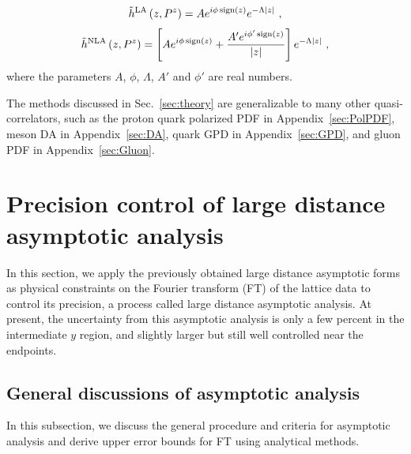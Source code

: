\documentclass[a4paper,11pt]{article}
\begin{document}
\begin{align}
\tilde{h}^{\rm LA}\left(z,P^z\right) = 
A e^{i \phi \, {\rm sign}(z)}  e^{-\Lambda |z|}  \ ,
\end{align}
\begin{align}
\tilde{h}^{\rm NLA}\left(z,P^z\right) = 
\left[A e^{i \phi \, {\rm sign}(z)}  + \frac{ A' e^{i \phi' \, {\rm sign}(z)} }{|z|} \right] e^{-\Lambda |z|}  \ ,
\end{align}
where the parameters $A$, $\phi$, $\Lambda$, $A'$ and $\phi'$ are real numbers.

The methods discussed in Sec.~\ref{sec:theory} are generalizable to many other quasi-correlators, such as the proton quark polarized PDF in Appendix~\ref{sec:PolPDF}, meson DA in Appendix~\ref{sec:DA}, quark GPD in Appendix~\ref{sec:GPD}, and gluon PDF in Appendix~\ref{sec:Gluon}.



\section{Precision control of large distance asymptotic analysis}\label{sec:numerics}
In this section, we apply the previously obtained large distance asymptotic forms as physical constraints on the Fourier transform (FT) of the lattice data to control its precision, a process called large distance asymptotic analysis. At present, the uncertainty from this asymptotic analysis is only a few percent in the intermediate $y$ region, and slightly larger but still well controlled near the endpoints. 

\subsection{General discussions of asymptotic analysis}
In this subsection, we discuss the general procedure and criteria for asymptotic analysis and derive upper error bounds for FT using analytical methods.  
\end{document}
